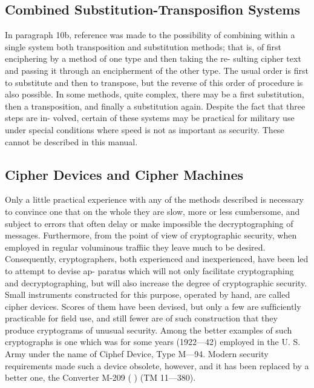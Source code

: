 \subsection{Combined Substitution-Transposifion Systems}

In paragraph 10b, reference was made to the possibility of combining
within a single system both transposition and substitution methods; that
is, of ﬁrst enciphering by a method of one type and then taking the re-
sulting cipher text and passing it through an encipherment of the other
type. The usual order is ﬁrst to substitute and then to transpose, but
the reverse of this order of procedure is also possible. In some methods,
quite complex, there may be a ﬁrst substitution, then a transposition, and
ﬁnally a substitution again. Despite the fact that three steps are in-
volved, certain of these systems may be practical for military use under
special conditions where speed is not as important as security. These
cannot be described in this manual.

\subsection{Cipher Devices and Cipher Machines}

\mypara Only a little practical experience with any of the methods described
is necessary to convince one that on the whole they are slow, more or less
cumbersome, and subject to errors that often delay or make impossible
the decryptographing of messages. Furthermore, from the point of view
of cryptographic security, when employed in regular voluminous traffiic
they leave much to be desired. Consequently, cryptographers, both experienced and inexperienced, have been led to attempt to devise ap-
paratus which will not only facilitate cryptographing and decryptographing, but will also increase the degree of cryptographic security. Small
instruments constructed for this purpose, operated by hand, are called
cipher devices. Scores of them have been devised, but only a few are
sufﬁciently practicable for ﬁeld use, and still fewer are of such construction that they produce cryptograms of unusual security. Among the
better examples of such cryptographs is one which was for some years
(1922—42) employed in the U. S. Army under the name of Ciphef
Device, Type M—94. Modern security requirements made such a device
obsolete, however, and it has been replaced by a better one, the Converter
M-209 ( ) (TM 11—380).

